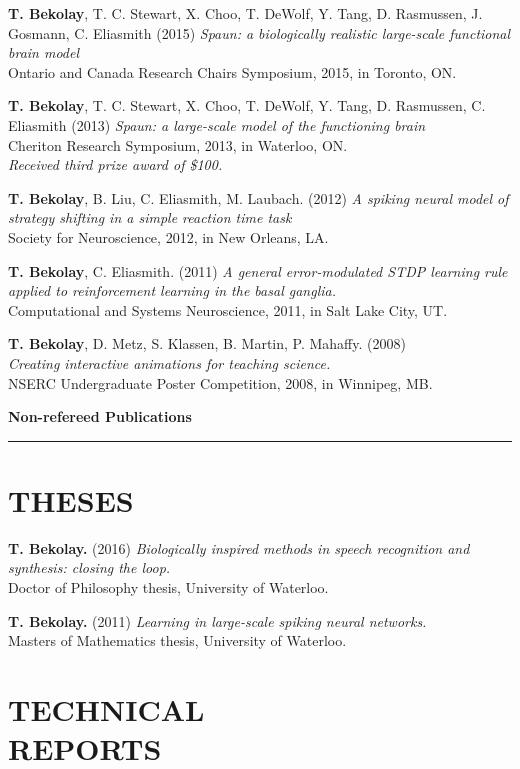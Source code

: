 \documentclass[line,margin]{res}
\begin{document}
\begin{resume}
\textbf{T. Bekolay}, T. C. Stewart, X. Choo, T. DeWolf, Y. Tang,
D. Rasmussen, J. Gosmann, C. Eliasmith (2015)
  {\sl Spaun: a biologically realistic large-scale functional brain model} \\
  Ontario and Canada Research Chairs Symposium, 2015, in Toronto, ON.

\textbf{T. Bekolay}, T. C. Stewart, X. Choo, T. DeWolf, Y. Tang,
D. Rasmussen, C. Eliasmith (2013)
  {\sl Spaun: a large-scale model of the functioning brain} \\
  Cheriton Research Symposium, 2013, in Waterloo, ON. \\
  {\sl Received third prize award of \$100.}

\textbf{T. Bekolay}, B. Liu, C. Eliasmith, M. Laubach. (2012)
  {\sl A spiking neural model of strategy shifting in a simple
  reaction time task} \\
  Society for Neuroscience, 2012, in New Orleans, LA.

\textbf{T. Bekolay}, C. Eliasmith. (2011)
  {\sl A general error-modulated STDP learning rule applied to
  reinforcement learning in the basal ganglia.} \\
  Computational and Systems Neuroscience, 2011, in Salt Lake City, UT.

\textbf{T. Bekolay}, D. Metz, S. Klassen, B. Martin, P. Mahaffy. (2008) \\
  {\sl Creating interactive animations for teaching science.} \\
  NSERC Undergraduate Poster Competition, 2008, in Winnipeg, MB.
  \vspace{0.42em}

{\Large \bf Non-refereed Publications} \\ \vspace{-8pt} \hrule

\section{THESES}

\textbf{T. Bekolay.} (2016)
  {\sl Biologically inspired methods in speech recognition and synthesis:
  closing the loop.} \\
  Doctor of Philosophy thesis, University of Waterloo.

\textbf{T. Bekolay.} (2011)
  {\sl Learning in large-scale spiking neural networks.} \\
  Masters of Mathematics thesis, University of Waterloo.

\section{TECHNICAL \\REPORTS}


\end{resume}
\end{document}

